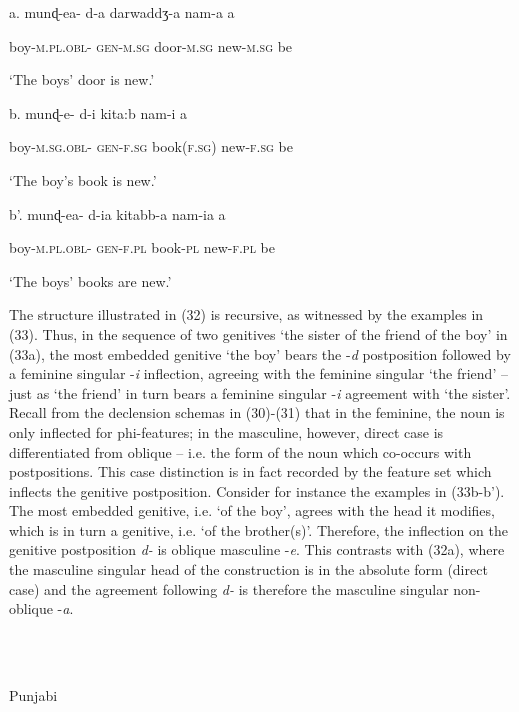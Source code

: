 \documentclass[output=paper]{langsci/langscibook}
\begin{document}
a.  munɖ-ea-    d-a     darwaddʒ-a   nam-a   a

boy-\textsc{m.pl.obl-  gen-m.sg}  door-\textsc{m.sg}  new-\textsc{m.sg}    be

‘The boys’ door is new.’

b.  munɖ-e-    d-i     kita:b     nam-i     a

boy-\textsc{m.sg.obl-  gen-f.sg}   book(\textsc{f.sg)}   new-\textsc{f.sg}   be

  ‘The boy’s book is new.’

b’.  munɖ-ea-    d-ia     kitabb-a   nam-ia   a

boy-\textsc{m.pl.obl-  gen-f.pl}   book-\textsc{pl}   new-\textsc{f.pl}   be

‘The boys’ books are new.’ 

\begin{stylefootnotetext}
The structure illustrated in (32) is recursive, as witnessed by the examples in (33). Thus, in the sequence of two genitives ‘the sister of the friend of the boy’ in (33a), the most embedded genitive ‘the boy’ bears the -\textit{d} postposition followed by a feminine singular -\textit{i} inflection, agreeing with the feminine singular ‘the friend’ – just as ‘the friend’ in turn bears a feminine singular -\textit{i} agreement with ‘the sister’. Recall from the declension schemas in (30)-(31) that in the feminine, the noun is only inflected for phi-features; in the masculine, however, direct case is differentiated from oblique – i.e. the form of the noun which co-occurs with postpositions. This case distinction is in fact recorded by the feature set which inflects the genitive postposition. Consider for instance the examples in (33b-b’). The most embedded genitive, i.e. ‘of the boy’, agrees with the head it modifies, which is in turn a genitive, i.e. ‘of the brother(s)’. Therefore, the inflection on the genitive postposition \textit{d-} is oblique masculine -\textit{e}. This contrasts with (32a), where the masculine singular head of the construction is in the absolute form (direct case) and the agreement following \textit{d-} is therefore the masculine singular non-oblique -\textit{a}.
\end{stylefootnotetext}

\begin{stylefootnotetext}
\ea%
    \label{ex:key:33}
    \gll\\
        \\
    \glt
    \z

          Punjabi
\end{stylefootnotetext}
\end{document}
